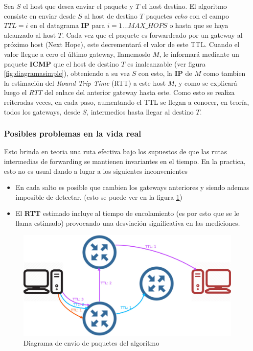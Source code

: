 Sea $S$ el host que desea enviar el paquete y $T$ el host destino.
El algoritmo consiste en enviar desde $S$ al host de destino $T$ paquetes
\emph{echo} con el campo $TTL=i$ en el datagrama \textbf{IP} para $i=1 \dots
MAX\_HOPS$ o hasta que se haya alcanzado al host $T$. Cada vez que el paquete
es forwardeado por un gateway al próximo host (Next Hope), este decrementará el
valor de este TTL. Cuando el valor llegue a cero el último gateway, llamemoslo
$M$, le informará mediante un paquete \textbf{ICMP} que el host de destino $T$
es inalcanzable (ver figura \ref{fig:diagramasimple}), obteniendo a su vez $S$ con esto, la \textbf{IP} de $M$ como
tambien la estimación del \textit{Round
Trip Time} (RTT) a este host $M$, y como se explicará luego el $RTT$ del enlace
del anterior gateway hasta este. Como esto se realiza reiteradas veces, en
cada paso, aumentando el TTL se llegan a conocer, en teoría, todos los
gateways, desde $S$, intermedios hasta llegar al destino $T$.

\subsubsection{Posibles problemas en la vida real}


Esto brinda en teoria una ruta efectiva bajo los supuestos de que
las rutas intermedias de forwarding se mantienen invariantes en el tiempo. En
la practica, esto no es usual dando a lugar a los siguientes inconvenientes

\begin{itemize}
	\item En cada salto es posible que cambien los gateways anteriores y siendo
	ademas imposible de detectar. (esto se puede ver en la figura \ref{fig:diagramareal})
	\item El \textbf{RTT} estimado incluye al tiempo de encolamiento (es por esto
	que se le llama estimado) provocando una desviación significativa en las
	mediciones.
\end{itemize}

\begin{figure}[ht]
	\begin{center}
		\includegraphics[width=0.8\columnwidth]{imagenes/diagrama_2.jpg}
		\caption{Diagrama de envio de paquetes del algoritmo}
		\label{fig:diagramareal}
	\end{center}
\end{figure}

